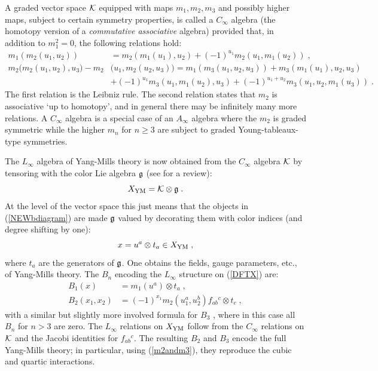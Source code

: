 \documentclass[12pt]{article}\pdfoutput=1
\def\be{\begin{equation}}
\def\ee{\end{equation}}
\begin{document}
A graded vector space ${\cal K}$ equipped with maps $m_1, m_2, m_3$ and possibly higher maps, subject 
to certain symmetry properties,  
is called a 
$C_{\infty}$ algebra (the homotopy version of a \textit{commutative associative} algebra)   
provided that, in addition to $m_1^2=0$, the following relations hold: 
\begin{equation}\label{C-relations}
\begin{split}
m_1(m_2(u_1,u_2))&=m_2(m_1(u_1),u_2)+(-1)^{u_1}m_2(u_1, m_1(u_2) )\;,\\ 
m_2\big(m_2(u_1,u_2), u_3\big)-m_2&\big(u_1,m_2(u_2,u_3)\big)=m_1(m_3(u_1,u_2,u_3))+m_3(m_1(u_1),u_2,u_3)\\
&+(-1)^{u_1}m_3(u_1,m_1(u_2),u_3)+(-1)^{u_1+u_2}m_3(u_1,u_2,m_1(u_3)) \;.
\end{split}    
\end{equation}
The first relation is the Leibniz rule. The second relation states  that $m_2$ is associative `up to homotopy', 
and in general there may be infinitely many more relations. A $C_{\infty}$ algebra is a special case of an 
$A_{\infty}$ algebra where the $m_2$ is graded symmetric while the higher $m_n$ for $n\geq 3$ are  subject 
to graded Young-tableaux-type symmetries. 


The $L_{\infty}$ algebra of Yang-Mills theory is now obtained from the $C_{\infty}$ algebra ${\cal K}$ 
by tensoring with the color Lie algebra $\frak{g}$ \cite{Zeitlin:2008cc} (see \cite{Borsten:2021hua} for a review): 
 \be\label{DFTX} 
  X_{\rm YM} = {\cal K}\otimes \frak{g}\;. 
 \ee
At the level of the vector space this just means that the objects in (\ref{NEWbdiagram}) are made $\frak{g}$ valued 
by decorating them with color indices (and degree shifting by one): 
 \be
  x = u^a\otimes t_a \in X_{\rm YM}\;, 
 \ee
where $t_a$ are the generators of  $\frak{g}$. One obtains the fields, gauge parameters, etc., 
of Yang-Mills theory. The 
$B_n$  encoding the $L_{\infty}$ structure on (\ref{DFTX})  are: 
 \be
  \begin{split}
   B_1(x) &= m_1(u^a)\otimes t_a\;, \\
   B_2(x_1,x_2) &= (-1)^{x_1} m_2(u_1^a, u_2^b) f_{ab}{}^{c} \otimes t_c\;, 
     \end{split}
 \ee 
with a similar but slightly more involved formula for $B_3$ \cite{Bonezzi:2022yuh}, where  in this case 
all $B_n$ for $n>3$ are zero.  
The $L_{\infty}$  relations on $X_{\rm YM}$  follow from the $C_{\infty}$ relations on ${\cal K}$ 
and the Jacobi identities for $f_{ab}{}^{c}$. The resulting $B_2$ and $B_3$ encode the full Yang-Mills theory; 
in particular, using (\ref{m2andm3}), they reproduce the cubic and quartic interactions. 
\end{document}
